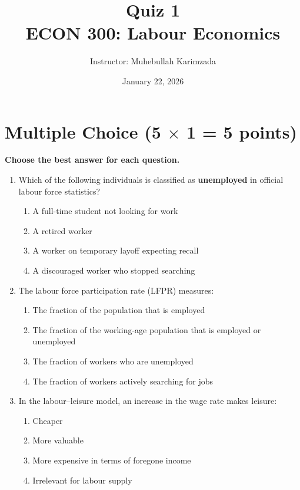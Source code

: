\documentclass[11pt]{article}
\title{\textbf{Quiz 1} \vspace{ 0.4cm }\\ECON 300: Labour Economics}
\author{Instructor: Muhebullah Karimzada}
\date{January 22,  2026}
\begin{document}
\maketitle

\section*{Multiple Choice (5 $\times$ 1 = 5 points)}

\textbf{Choose the best answer for each question.}

\begin{enumerate}
\item Which of the following individuals is classified as \textbf{unemployed} in official labour force statistics?

\begin{enumerate}
\item A full-time student not looking for work  
\item A retired worker  
\item A worker on temporary layoff expecting recall  
\item A discouraged worker who stopped searching  
\end{enumerate}

\item The labour force participation rate (LFPR) measures:

\begin{enumerate}
\item The fraction of the population that is employed  
\item The fraction of the working-age population that is employed or unemployed  
\item The fraction of workers who are unemployed  
\item The fraction of workers actively searching for jobs  
\end{enumerate}

\item In the labour--leisure model, an increase in the wage rate makes leisure:

\begin{enumerate}
\item Cheaper  
\item More valuable  
\item More expensive in terms of foregone income  
\item Irrelevant for labour supply  
\end{enumerate}


\end{enumerate}
\end{document}
